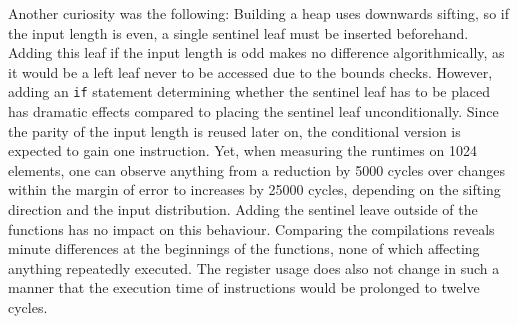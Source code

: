 Another curiosity was the following:
Building a heap uses downwards sifting, so if the input length is even, a single sentinel leaf must be inserted beforehand.
Adding this leaf if the input length is odd makes no difference algorithmically, as it would be a left leaf never to be accessed due to the bounds checks.
However, adding an \lstinline[keywords={}]|if| statement determining whether the sentinel leaf has to be placed has dramatic effects compared to placing the sentinel leaf unconditionally.
Since the parity of the input length is reused later on, the conditional version is expected to gain one instruction.
Yet, when measuring the runtimes on 1024 elements, one can observe anything from a reduction by \num{5000} cycles over changes within the margin of error to increases by \num{25000} cycles, depending on the sifting direction and the input distribution.
Adding the sentinel leave outside of the \HS{} functions has no impact on this behaviour.
Comparing the compilations reveals minute differences at the beginnings of the \HS{} functions, none of which affecting anything repeatedly executed.
The register usage does also not change in such a manner that the execution time of instructions would be prolonged to twelve cycles.
